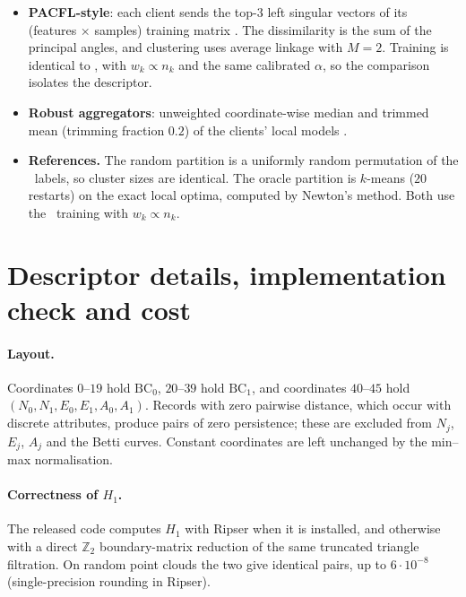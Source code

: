 \begin{itemize}[leftmargin=1.2em,itemsep=2pt]
\begin{itemize}[leftmargin=1.2em,itemsep=1pt]
        client choose the same cluster.
      \item In each round, every client selects the cluster model with the lowest training
        loss; each cluster then averages its members' local models.
    \end{itemize}
  \item \textbf{PACFL-style}: each client sends the top-$3$ left singular vectors of its
    (features $\times$ samples) training matrix \citep{vahidian2023efficient}. The
    dissimilarity is the sum of the principal angles, and clustering uses average linkage
    with $M=2$. Training is identical to \ptopofl, with $w_k\propto n_k$ and the same
    calibrated $\alpha$, so the comparison isolates the descriptor.
  \item \textbf{Robust aggregators}: unweighted coordinate-wise median and trimmed mean
    (trimming fraction $0.2$) of the clients' local models \citep{yin2018byzantine}.
  \item \textbf{References.} The random partition is a uniformly random permutation of the
    \ptopofl\ labels, so cluster sizes are identical. The oracle partition is $k$-means
    ($20$ restarts) on the exact local optima, computed by Newton's method. Both use the
    \ptopofl\ training with $w_k\propto n_k$.
\end{itemize}

\section{Descriptor details, implementation check and cost}
\label{app:cost}
\paragraph{Layout.} Coordinates $0$--$19$ hold $\mathrm{BC}_0$, $20$--$39$ hold
$\mathrm{BC}_1$, and coordinates $40$--$45$ hold $(N_0,N_1,E_0,E_1,A_0,A_1)$. Records with
zero pairwise distance, which occur with discrete attributes, produce pairs of zero
persistence; these are excluded from $N_j$, $E_j$, $A_j$ and the Betti curves. Constant
coordinates are left unchanged by the min--max normalisation.

\paragraph{Correctness of $H_1$.} The released code computes $H_1$ with Ripser when it is
installed, and otherwise with a direct $\mathbb{Z}_2$ boundary-matrix reduction of the same
truncated triangle filtration. On random point clouds the two give identical pairs, up to
$6\cdot10^{-8}$ (single-precision rounding in Ripser).

